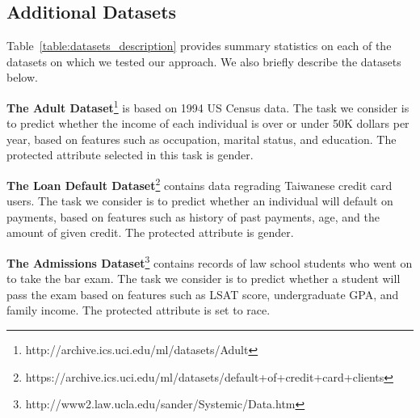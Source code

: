 





\subsection{Additional Datasets}


Table~\ref{table:datasets_description} provides summary statistics on each of the datasets on which we tested our approach. We also briefly describe the datasets below. 


{\bf The Adult Dataset}\footnote{http://archive.ics.uci.edu/ml/datasets/Adult} is based on 1994 US Census data. The task we consider is to predict whether the income of each individual is over or under 50K dollars per year, based on features such as occupation, marital status, and education. The protected attribute selected in this task is gender. 

{\bf The Loan Default Dataset}\footnote{{\scriptsize https://archive.ics.uci.edu/ml/datasets/default+of+credit+card+clients}}
contains data regrading Taiwanese credit card users. The task we consider is to predict whether an individual will default on payments, based on features such as history of past payments, age, and the amount of given credit. The protected attribute is gender.

{\bf The Admissions Dataset}\footnote{http://www2.law.ucla.edu/sander/Systemic/Data.htm}
contains records of law school students who went on to take the bar exam. The task we consider is to predict whether a student will pass the exam based on features such as LSAT score, undergraduate GPA, and family income. The protected attribute is set to race.

